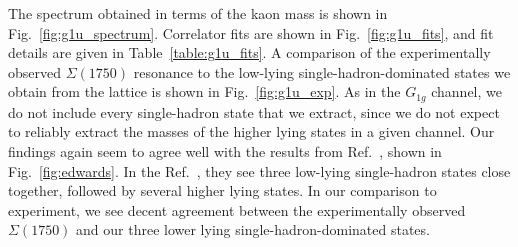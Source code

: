The spectrum obtained in terms of the kaon mass is shown in Fig.~\ref{fig:g1u_spectrum}. Correlator fits are shown in Fig.~\ref{fig:g1u_fits}, and fit details are given in Table~\ref{table:g1u_fits}. A comparison of the experimentally observed $\Sigma(1750)$ resonance to the low-lying single-hadron-dominated states we obtain from the lattice is shown in Fig.~\ref{fig:g1u_exp}. As in the $G_{1g}$ channel, we do not include every single-hadron state that we extract, since we do not expect to reliably extract the masses of the higher lying states in a given channel. Our findings again seem to agree well with the results from Ref.~\cite{Edwards:2012fx}, shown in Fig.~\ref{fig:edwards}. In the Ref.~\cite{Edwards:2012fx}, they see three low-lying single-hadron states close together, followed by several higher lying states. In our comparison to experiment, we see decent agreement between the experimentally observed $\Sigma(1750)$ and our three lower lying single-hadron-dominated states.
